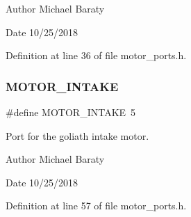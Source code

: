 \begin{DoxyAuthor}{Author}
Michael Baraty 
\end{DoxyAuthor}
\begin{DoxyDate}{Date}
10/25/2018 
\end{DoxyDate}


Definition at line 36 of file motor\+\_\+ports.\+h.

\mbox{\label{motor__ports_8h_a8478b6a82af1c8159ef255956ef2561b}} 
\subsubsection{M\+O\+T\+O\+R\+\_\+\+I\+N\+T\+A\+KE}
{\footnotesize\ttfamily \#define M\+O\+T\+O\+R\+\_\+\+I\+N\+T\+A\+KE~5}



Port for the goliath intake motor. 

\begin{DoxyAuthor}{Author}
Michael Baraty 
\end{DoxyAuthor}
\begin{DoxyDate}{Date}
10/25/2018 
\end{DoxyDate}


Definition at line 57 of file motor\+\_\+ports.\+h.

